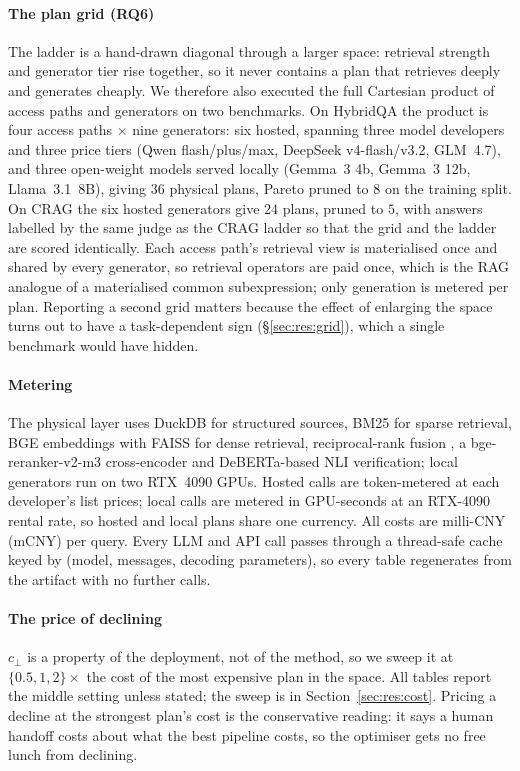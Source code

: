 \paragraph{The plan grid (RQ6)}
The ladder is a hand-drawn diagonal through a larger space: retrieval
strength and generator tier rise together, so it never contains a plan
that retrieves deeply and generates cheaply. We therefore also executed
the full Cartesian product of access paths and generators on two
benchmarks. On HybridQA the product is four access paths $\times$ nine
generators: six hosted, spanning three model developers and three price
tiers (Qwen flash/plus/max, DeepSeek v4-flash/v3.2, GLM~4.7), and three
open-weight models served locally (Gemma~3 4b, Gemma~3 12b,
Llama~3.1~8B), giving $36$ physical plans, Pareto pruned to $8$ on the
training split. On CRAG the six hosted generators give $24$ plans,
pruned to $5$, with answers labelled by the same judge as the CRAG
ladder so that the grid and the ladder are scored identically. Each
access path's retrieval view is materialised once and shared by every
generator, so retrieval operators are paid once, which is the RAG
analogue of a materialised common subexpression; only generation is
metered per plan. Reporting a second grid matters because the effect of
enlarging the space turns out to have a task-dependent sign
(\S\ref{sec:res:grid}), which a single benchmark would have hidden.

\paragraph{Metering}
The physical layer uses DuckDB \citep{raasveldt2019duckdb} for
structured sources, BM25 \citep{robertson2009bm25} for sparse
retrieval, BGE embeddings \citep{xiao2023bge} with FAISS
\citep{johnson2019faiss} for dense retrieval, reciprocal-rank fusion
\citep{cormack2009rrf}, a bge-reranker-v2-m3 cross-encoder and
DeBERTa-based NLI verification; local generators run on two RTX~4090
GPUs. Hosted calls are token-metered at each developer's list prices;
local calls are metered in GPU-seconds at an RTX-4090 rental rate, so
hosted and local plans share one currency. All costs are milli-CNY
(mCNY) per query. Every LLM and API call passes through a thread-safe
cache keyed by (model, messages, decoding parameters), so every table
regenerates from the artifact with no further calls.

\paragraph{The price of declining}
$c_\bot$ is a property of the deployment, not of the method, so we sweep
it at $\{0.5, 1, 2\}\times$ the cost of the most expensive plan in the
space. All tables report the middle setting unless stated; the sweep is
in Section~\ref{sec:res:cost}. Pricing a decline at the strongest plan's
cost is the conservative reading: it says a human handoff costs about
what the best pipeline costs, so the optimiser gets no free lunch from
declining.

